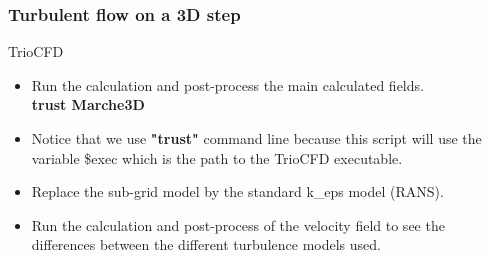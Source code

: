 \documentclass[10pt]{beamer}
\begin{document}
\begin{frame}
\frametitle{Turbulent flow on a 3D step}
\begin{block}{TrioCFD}

\begin{itemize}

\item Run the calculation and post-process the main calculated fields.\\
\textbf{trust Marche3D} \\

\item Notice that we use \textbf{"trust"} command line because this script will use the variable \$exec which is the path to the TrioCFD executable.

\item Replace the sub-grid model by the standard k\_eps model (RANS).
\item Run the calculation and post-process of the velocity field to see the differences between the different turbulence models used.
\end{itemize}

\end{block}
\end{frame}
\end{document}
